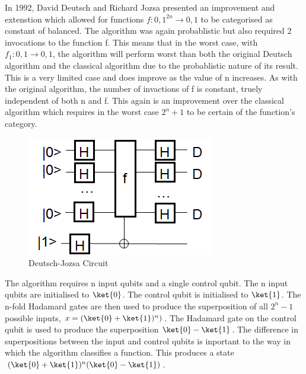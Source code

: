 \documentclass[authoryearcitations]{UoYCSproject}
\begin{document}
In 1992, David Deutsch and Richard Jozsa\cite{1992-deutsch} presented an improvement and extenstion which allowed for functions $f:{0,1}^{2n}\to{0,1}$ to be categorised as constant of balanced.
The algorithm was again probablistic but also required 2 invocations to the function f.
This means that in the worst case, with $f_1:{0,1}\to{0,1}$, the algorithm will perform worst than both the original Deutsch algorithm\cite{Deutsch1985} and the classical algorithm due to the probablistic nature of its result.
This is a very limited case and does improve as the value of n increases.
As with the original algorithm, the number of invactions of f is constant, truely independent of both n and f.
This again is an improvement over the classical algorithm which requires in the worst case $2^n+1$ to be certain of the function's category.

\begin{figure}
\centering
\includegraphics{Deutsch-Jozsa}
\caption{Deutsch-Jozsa Circuit}
\label{Deutsch-Jozsa-Cir}
\end{figure}

The algorithm requires n input qubits and a single control qubit.
The n input qubits are initialised to $\ket{0}$.
The control qubit is initialised to $\ket{1}$.
The n-fold Hadamard gates are then used to produce the superposition of all $2^n-1$ possible inputs, $x = (\ket{0}+\ket{1})^n)$.
The Hadamard gate on the control qubit is used to produce the superposition $\ket{0}-\ket{1}$.
The difference in superpositions between the input and control qubits is inportant to the way in which the algorithm classifies a function.
This produces a state  $(\ket{0}+\ket{1})^n(\ket{0}-\ket{1})$.
\end{document}
